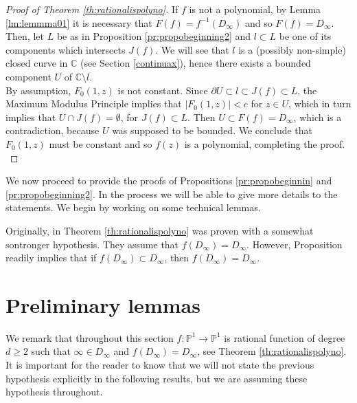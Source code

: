 \begin{proof}[Proof of Theorem \ref{th:rationalispolyno}]
If $f$ is not a polynomial, by Lemma \ref{lm:lemmma01} it is necessary that $F(f) = f^{-1}(D_\infty)$ and so $F(f) = D_\infty$.
Then, let $L$ be as in Proposition \ref{pr:propobeginning2} and $l\subset L$ be one of its components which intersects $J(f)$. We will see that $l$ is a (possibly non-simple) closed curve in $\mathbb{C}$ (see Section \ref{continuax}), hence there exists a bounded component $U$ of $\mathbb{C}\setminus l$.\\

By assumption, $F_0(1,z)$ is not constant. Since $\partial U \subset l \subset J(f) \subset L$, the Maximum Modulus Principle implies that $|F_0(1,z)|<c$ for $z\in U$, which in turn implies that $U\cap J(f)=\emptyset$, for $J(f)\subset L$. Then $U\subset F(f) = D_\infty$, which is a contradiction, because $U$ was supposed to be bounded. We conclude that $F_0(1,z)$ must be constant and so $f(z)$ is a polynomial, completing the proof.\\
\end{proof}

We now proceed to provide the proofs of Propositions \ref{pr:propobeginnin} and \ref{pr:propobeginning2}. In the process we will be able to give more details to the statements. We begin by working on some technical lemmas.

\begin{myrmk}{}{}
Originally, in \cite{okuyama} Theorem \ref{th:rationalispolyno} was proven with a somewhat sontronger hypothesis. They assume that $f(D_\infty)=D_\infty$. However, Proposition readily implies that if $f(D_\infty)\subset D_\infty$, then $f(D_\infty)=D_\infty$.
\end{myrmk}{}{}

\section{Preliminary lemmas}\label{preleminary_lemmas}

We remark that throughout this section $f:\mathbb{P}^1 \rightarrow \mathbb{P}^1$ is rational function of degree $d\geq 2$ such that $\infty \in D_\infty$ and $f(D_\infty) = D_\infty$, see Theorem \ref{th:rationalispolyno}. It is important for the reader to know that we will not state the previous hypothesis explicitly in the following results, but we are assuming these hypothesis throughout.\\

